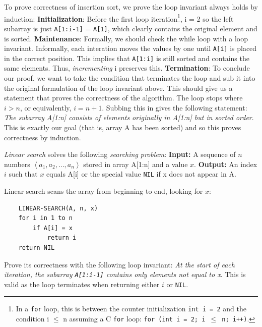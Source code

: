 \documentclass[12pt]{article}
\begin{document}
To prove correctness of insertion sort, we prove the loop invariant always holds by induction:
\newline \textbf{Initialization}: Before the first loop iteration\footnote{In a \texttt{for} loop, this is between the counter initialization \texttt{int i = 2} and the condition
i $\leq$ n assuming a C \texttt{for} loop: \texttt{for (int i = 2; i $\leq$ n; i++)}.}, i = 2 so the left
subarray is just \texttt{A[1:i-1]} = \texttt{A[1]}, which clearly contains the original element and is sorted.
\newline \textbf{Maintenance}: Formally, we should check the while loop with a loop invariant. Informally, each interation
moves the values by one until \texttt{A[i]} is placed in the correct position. This implies that \texttt{A[1:i]}
is still sorted and contains the same elements. Thus, \textit{incrementing} i preserves this.
\newline \textbf{Termination}: To conclude our proof, we want to take the condition that terminates the loop and sub
it into the original formulation of the loop invariant above. This should give us a statement that proves the correctness of the
algorithm. The loop stops where $i > n$, or equivalently, $i = n + 1$. Subbing this in gives the following statement:
\textit{The subarray A[1:n] consists of elements originally in A[1:n] but in sorted order}. This is exactly our goal (that is, array A
has been sorted) and so this proves correctness by induction.

\textit{Linear search} solves the following \textit{searching problem}:
\newline \textbf{Input:} A sequence of $n$ numbers $\left\langle a_1, a_2, ..., a_n\right\rangle$ stored in array
A[1:n] and a value $x$.
\newline \textbf{Output:} An index $i$ such that $x$ equals A[i] or the special value \texttt{NIL} if x does not appear
in A.

Linear search scans the array from beginning to end, looking for $x$:
\begin{lstlisting}
    LINEAR-SEARCH(A, n, x)
    for i in 1 to n
        if A[i] = x
            return i
    return NIL
\end{lstlisting}

Prove its correctness with the following loop invariant: \textit{At the start of each iteration, the
subarray \texttt{A[1:i-1]} contains only elements not equal to x}. This is valid as the loop terminates when
returning either $i$ or \texttt{NIL}.
\end{document}
